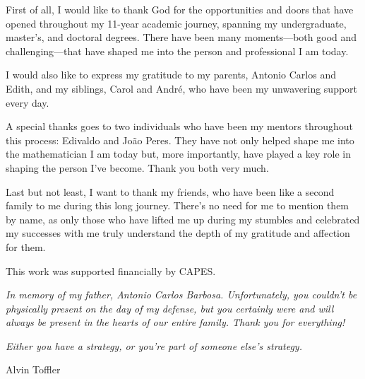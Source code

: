 \documentclass[12pt,oneside]{book}
\begin{document}
First of all, I would like to thank God for the opportunities and doors that have opened throughout my 
11-year academic journey, spanning my undergraduate, master’s, and doctoral degrees. There have been 
many moments—both good and challenging—that have shaped me into the person and professional I am today.

I would also like to express my gratitude to my parents, Antonio Carlos and Edith, and my siblings, 
Carol and André, who have been my unwavering support every day.

A special thanks goes to two individuals who have been my mentors throughout this process: Edivaldo and 
João Peres. They have not only helped shape me into the mathematician I am today but, more importantly, 
have played a key role in shaping the person I’ve become. Thank you both very much.

Last but not least, I want to thank my friends, who have been like a second family to me during this 
long journey. There’s no need for me to mention them by name, as only those who have lifted me up during 
my stumbles and celebrated my successes with me truly understand the depth of my gratitude and affection 
for them.

This work was supported financially by CAPES.



\vspace{2cm}

\begin{center}
    \begin{minipage}{10cm}
        \textit{In memory of my father, Antonio Carlos Barbosa. Unfortunately, you couldn't be 
        physically present on the day of my defense, but you certainly were and will always be present 
        in the hearts of our entire family. Thank you for everything!}
    \end{minipage}
\end{center}



\newpage
\thispagestyle{empty}

\begin{flushright}
    \begin{minipage}{7cm}
        \begin{flushright}
            \vspace{22cm}\textit{Either you have a strategy, or you're part of someone else's strategy.}

            \vspace{0.2cm} Alvin Toffler
        \end{flushright}
    \end{minipage}
\end{flushright}
\end{document}
